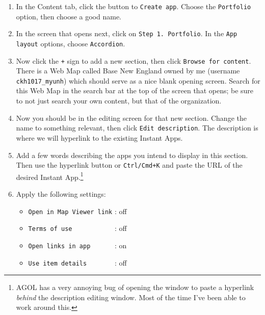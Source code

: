 \documentclass{article}
\newcommand{\blue}[1]{{\color{blue}{#1}}}
\begin{document}
\begin{enumerate}
    
    \item 
    In the Content tab, click the button to \verb|Create app|.
    Choose the \verb|Portfolio| option, then choose a good name.


    \item 
    In the screen that opens next, click on \verb|Step 1. Portfolio|.
    In the \verb|App layout| options, choose \verb|Accordion|.


    \item 
    Now click the \verb|+| sign to add a new section, then click \verb|Browse for content|.
    There is a Web Map called Base New England owned by me (username \verb|ckh1017_myunh|)
    which should serve as a nice blank opening screen.
    Search for this Web Map in the search bar at the top of the screen that opens;
    be sure to not just search your own content, but that of the organization.


    \item 
    Now you should be in the editing screen for that new section.
    Change the name to something relevant, then click \verb|Edit description|.
    The description is where we will hyperlink to the existing Instant Apps.


    \item 
    Add a few words describing the apps you intend to display in this section.
    Then use the hyperlink button or \verb|Ctrl/Cmd+K| and paste the URL of the desired Instant App.\footnote{
        AGOL has a very annoying bug of opening the window to paste a hyperlink \textit{behind} 
        the description editing window.
        Most of the time I've been able to work around this.
    }

    

    \item 
    Apply the following settings:
    \begin{itemize}
        \item \verb|Open in Map Viewer link| : off
        \item \verb|Terms of use           | : off
        \item \verb|Open links in app      | : on \blue{IMPORTANT}
        \item \verb|Use item details       | : off
    \end{itemize}


\end{enumerate}
\end{document}
